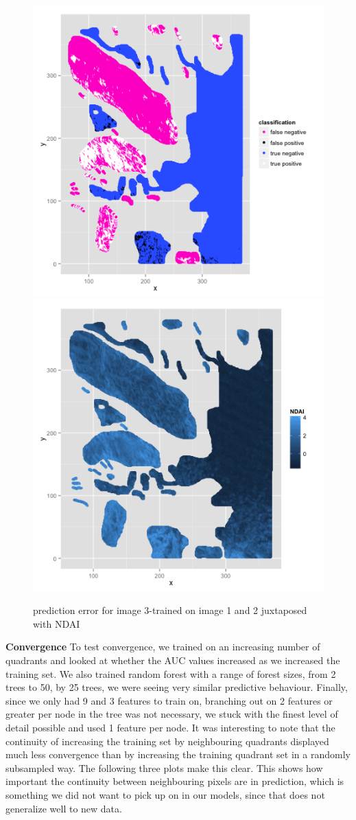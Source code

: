 \documentclass{article}\usepackage[]{graphicx}\usepackage[]{color}
\begin{document}
  \begin{figure}[H]
  \includegraphics[width=\linewidth, height = 170pts ]{classification_image3.png}
\endminipage\hfill
{}
  \includegraphics[width=\linewidth, height = 170pts]{NDAI_image3.png}
\endminipage\hfill
\caption{prediction error for image 3-trained on image 1 and 2 juxtaposed with NDAI}
\end{figure}

{\bf Convergence} 
 To test convergence, we trained on an increasing number of quadrants and looked at whether the AUC values increased as we increased the training set.  We also trained random forest with a range of forest sizes, from 2 trees to 50, by 25 trees, we were seeing very similar predictive behaviour.  Finally, since we only had 9 and 3 features to train on, branching out on 2 features or greater per node in the tree was not necessary, we stuck with the finest level of detail possible and used 1 feature per node. It was interesting to note that the continuity of increasing the training set by neighbouring quadrants displayed much less convergence than by increasing the training quadrant set in a randomly subsampled way.  The following three plots make this clear.  This shows how important the continuity between neighbouring pixels are in prediction, which is something we did not want to pick up on in our models, since that does not generalize well to new data.  \\
\end{document}
